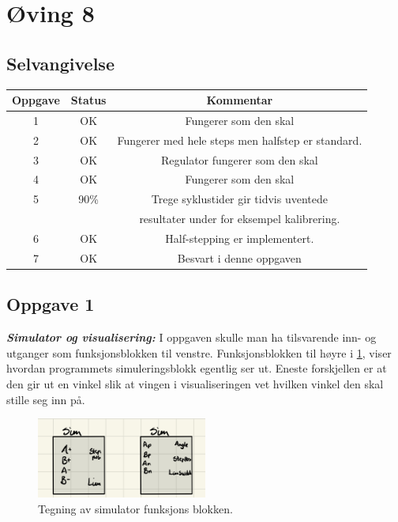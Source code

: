 \section{Øving 8}
\subsection{Selvangivelse}

\begin{center}
\begin{tabular}{ |c|c|c|}
\hline
Oppgave & Status & Kommentar \\
\hline
1 & OK & Fungerer som den skal \\ 
\hline
2 & OK & Fungerer med hele steps men halfstep er standard. \\  
\hline
3 & OK & Regulator fungerer som den skal \\
\hline
4 & OK & Fungerer som den skal \\
\hline
5 & 90\% & Trege syklustider gir tidvis uventede  \\
& & resultater under for eksempel kalibrering. \\
\hline
6 & OK & Half-stepping er implementert. \\
\hline
7 & OK & Besvart i denne oppgaven \\
\hline
\end{tabular}
\label{tab:Selvangivelse}
\end{center}

\subsection{Oppgave 1}
\textbf{\textit{ Simulator og visualisering: }}
\newline
I oppgaven skulle man ha tilsvarende inn- og utganger som funksjonsblokken til venstre. Funksjonsblokken til høyre i \ref{fig:Simulator}, viser hvordan programmets simuleringsblokk egentlig ser ut. Eneste forskjellen er at den gir ut en vinkel slik at vingen i visualiseringen vet hvilken vinkel den skal stille seg inn på.

\begin{figure}[h!]
    \centering
    \includegraphics[width = 0.5\textwidth]{Images/Simulator.jpeg}
    \caption{Tegning av simulator funksjons blokken.}
    \label{fig:Simulator}
\end{figure}

